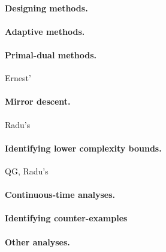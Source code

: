 \documentclass[11pt,a4paper]{article}
\begin{document}
	\paragraph{Designing methods.}
	\paragraph{Adaptive methods.}
	\paragraph{Primal-dual methods.} Ernest'
	\paragraph{Mirror descent.} Radu's
	\paragraph{Identifying lower complexity bounds.} QG, Radu's
	\paragraph{Continuous-time analyses.}
	\paragraph{Identifying counter-examples}
	\paragraph{Other analyses.}
	
	

{}
\end{document}
